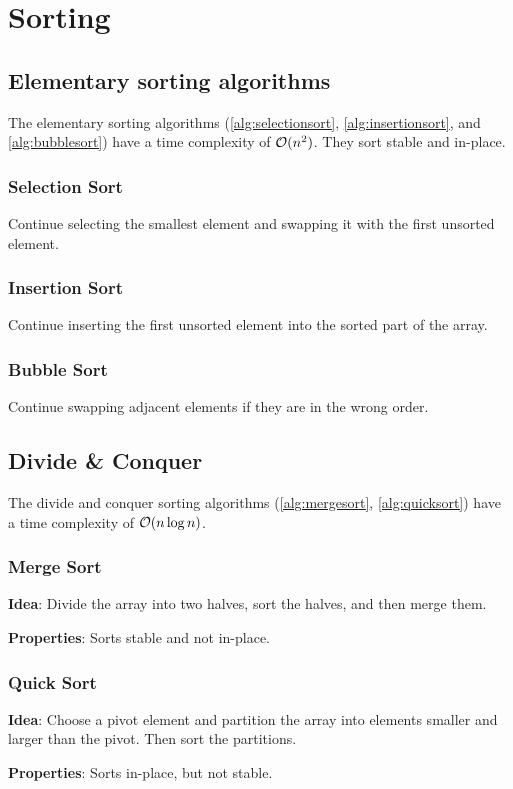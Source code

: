 \documentclass{article}
\begin{document}
\section{Sorting}
\subsection{Elementary sorting algorithms}
The elementary sorting algorithms (\ref{alg:selectionsort}, \ref{alg:insertionsort}, and \ref{alg:bubblesort}) have a time complexity of $\mathcal{O}(n^2)$. They sort stable and in-place.
\subsubsection{Selection Sort}
Continue selecting the smallest element and swapping it with the first unsorted element.\par


\subsubsection{Insertion Sort}
Continue inserting the first unsorted element into the sorted part of the array.\par


\subsubsection{Bubble Sort}
Continue swapping adjacent elements if they are in the wrong order.\par


\subsection{Divide \& Conquer}
The divide and conquer sorting algorithms (\ref{alg:mergesort}, \ref{alg:quicksort}) have a time complexity of $\mathcal{O}(n\log n)$.
\subsubsection{Merge Sort}
\textbf{Idea}: Divide the array into two halves, sort the halves, and then merge them.\par
\textbf{Properties}: Sorts stable and not in-place.\par


\subsubsection{Quick Sort}
\textbf{Idea}: Choose a pivot element and partition the array into elements smaller and larger than the pivot. Then sort the partitions.\par
\textbf{Properties}: Sorts in-place, but not stable.\par

\end{document}
